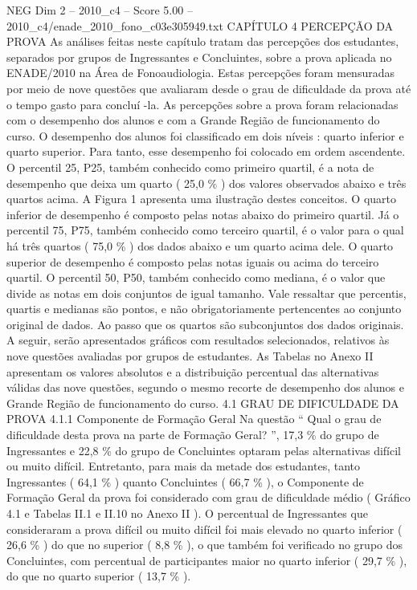 \begin{textsample}{NEG Dim 2 – 2010\_c4 – Score 5.00 – 2010\_c4/enade\_2010\_fono\_c03e305949.txt}  \label{ex:f2_neg_289}
CAPÍTULO 4 PERCEPÇÃO DA PROVA As análises feitas neste capítulo tratam das percepções dos estudantes, separados por grupos de Ingressantes e Concluintes, sobre a prova aplicada no ENADE/2010 na Área de Fonoaudiologia.
Estas percepções foram mensuradas por meio de nove questões que avaliaram desde o grau de dificuldade da prova até o tempo gasto para concluí -la.
As percepções sobre a prova foram relacionadas com o desempenho dos alunos e com a Grande Região de funcionamento do curso.
O desempenho dos alunos foi classificado em dois níveis : quarto inferior e quarto superior.
Para tanto, esse desempenho foi colocado em ordem ascendente.
O percentil 25, P25, também conhecido como primeiro quartil, é a nota de desempenho que deixa um quarto ( 25,0 \% ) dos valores observados abaixo e três quartos acima.
A Figura 1 apresenta uma ilustração destes conceitos.
O quarto inferior de desempenho é composto pelas notas abaixo do primeiro quartil.
Já o percentil 75, P75, também conhecido como terceiro quartil, é o valor para o qual há três quartos ( 75,0 \% ) dos dados abaixo e um quarto acima dele.
O quarto superior de desempenho é composto pelas notas iguais ou acima do terceiro quartil.
O percentil 50, P50, também conhecido como mediana, é o valor que divide as notas em dois conjuntos de igual tamanho.
Vale ressaltar que percentis, quartis e medianas são pontos, e não obrigatoriamente pertencentes ao conjunto original de dados.
Ao passo que os quartos são subconjuntos dos dados originais.
A seguir, serão apresentados gráficos com resultados selecionados, relativos às nove questões avaliadas por grupos de estudantes.
As Tabelas no Anexo II apresentam os valores absolutos e a distribuição percentual das alternativas válidas das nove questões, segundo o mesmo recorte de desempenho dos alunos e Grande Região de funcionamento do curso. 4.1 GRAU DE DIFICULDADE DA PROVA 4.1.1 Componente de Formação Geral Na questão “ Qual o grau de dificuldade desta prova na parte de Formação Geral? ”, 17,3 \% do grupo de Ingressantes e 22,8 \% do grupo de Concluintes optaram pelas alternativas difícil ou muito difícil.
Entretanto, para mais da metade dos estudantes, tanto Ingressantes ( 64,1 \% ) quanto Concluintes ( 66,7 \% ), o Componente de Formação Geral da prova foi considerado com grau de dificuldade médio ( Gráfico 4.1 e Tabelas II.1 e II.10 no Anexo II ).
O percentual de Ingressantes que consideraram a prova difícil ou muito difícil foi mais elevado no quarto inferior ( 26,6 \% ) do que no superior ( 8,8 \% ), o que também foi verificado no grupo dos Concluintes, com percentual de participantes maior no quarto inferior ( 29,7 \% ), do que no quarto superior ( 13,7 \% ).

\end{textsample}
